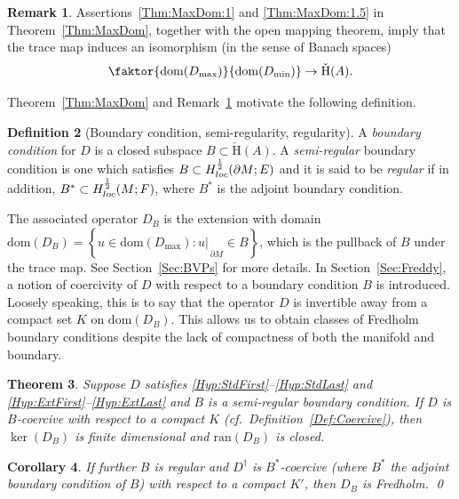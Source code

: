 \documentclass[a4paper,10pt,reqno]{amsart}
\newcommand{\rest}[1]{{{\lvert_{}}_{}}_{#1}}
\newcommand{\dbrac}[1]{\left\{#1\right\}}
\newcommand{\set}[1]{\dbrac{#1}}
\newcommand{\Hard}[2][{}]{{\rm H}^{#2}_{\rm #1}}%
\newcommand{\SobH}[2][{}]{\Hard[#1]{\rm #2}}
\newcommand{\checkH}{\check{\mathrm{H}}}
\newcommand{\ran}{\mathrm{ran}}
\newcommand{\dom}{\mathrm{dom}}
\newcommand{\dM}{\partial M}
\newtheorem{theorem}{Theorem}[section]
\newtheorem{corollary}[theorem]{Corollary}
\theoremstyle{definition}
\newtheorem{definition}[theorem]{Definition}
\newtheorem{remark}[theorem]{Remark}
\begin{document}
\begin{remark}
\label{rem:maxmin}
Assertions~\ref{Thm:MaxDom:1} and \ref{Thm:MaxDom:1.5} in Theorem~\ref{Thm:MaxDom}, together with the open mapping theorem, imply that the trace map induces an isomorphism (in the sense of Banach spaces)
\begin{equation*}
\faktor{\dom(D_{\max})}{\dom(D_{\min})} \to \checkH(A).
\end{equation*}
\end{remark}

Theorem~\ref{Thm:MaxDom} and Remark~\ref{rem:maxmin} motivate the following definition.
\begin{definition}[Boundary condition, semi-regularity, regularity]
A \emph{boundary condition} for $D$ is a closed subspace $B \subset \checkH(A)$.
A \emph{semi-regular} boundary condition is one which satisfies $B \subset \SobH[loc]{\frac12}(\dM;E)$ and it is said to be \emph{regular} if in addition, $B^\ast \subset \SobH[loc]{\frac12}(M;F)$, where $B^\ast$ is the adjoint boundary condition.
\end{definition}

The associated operator $D_B$ is the extension with domain $\dom(D_B) = \set{u \in\dom(D_{\max}): u\rest\dM \in B}$, which is the pullback of $B$ under the trace map.
See  Section~\ref{Sec:BVPs} for more details.
In Section~\ref{Sec:Freddy}, a notion of coercivity of $D$ with respect to a boundary condition $B$ is introduced.
Loosely speaking, this is to say that the operator $D$ is invertible away from a compact set $K$ on $\dom(D_B)$.
This allows us to obtain classes of Fredholm boundary conditions despite the lack of compactness of both the manifold and boundary.

\begin{theorem}
\label{Thm:Coercive}
Suppose $D$ satisfies \ref{Hyp:StdFirst}--\ref{Hyp:StdLast} and \ref{Hyp:ExtFirst}--\ref{Hyp:ExtLast} and $B$ is a semi-regular boundary condition.
If $D$ is $B$-coercive with respect to a compact $K$ (cf.\ Definition~\ref{Def:Coercive}), then $\ker(D_B)$ is finite dimensional and $\ran(D_B)$ is closed.
\end{theorem}


\begin{corollary}
\label{Cor:Coercive}
If further $B$ is regular and $D^\dagger$ is $B^\ast$-coercive (where $B^\ast$ the adjoint boundary condition of $B$) with respect to a compact $K'$, then $D_B$ is Fredholm.
\hfill\qed
\end{corollary}
\end{document}
